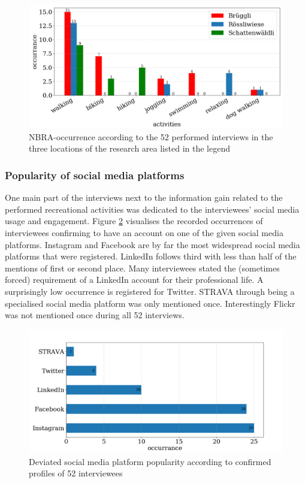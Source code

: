 \begin{figure}[h!]
   \centering
   \includegraphics[width=\textwidth]{img/interview_activities.pdf}
   \caption{NBRA-occurrence according to the 52 performed interviews in the three locations of the research area listed in the legend}
   \label{fig:interview_activities}
\end{figure}

\subsubsection{Popularity of social media platforms}
One main part of the interviews next to the information gain related to the performed recreational activities was dedicated to the interviewees' social media usage and engagement. Figure \ref{fig:interview_SMP} visualises the recorded occurrences of interviewees confirming to have an account on one of the given social media platforms. Instagram and Facebook are by far the most widespread social media platforms that were registered. LinkedIn follows third with less than half of the mentions of first or second place. Many interviewees stated the (sometimes forced) requirement of a LinkedIn account for their professional life. A surprisingly low occurrence is registered for Twitter. STRAVA through being a specialised social media platform was only mentioned once. Interestingly Flickr was not mentioned once during all 52 interviews.

\begin{figure}[h!]
   \centering
   \includegraphics[width=\textwidth]{img/interview_socialmedia_bigger_font.pdf}
   \caption{Deviated social media platform popularity according to confirmed profiles of 52 interviewees}
   \label{fig:interview_SMP}
\end{figure}

